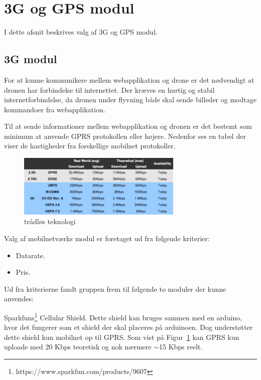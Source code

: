 \section{3G og GPS modul}

I dette afsnit beskrives valg af 3G og GPS modul. 

\subsection{3G modul}
For at kunne kommunikere mellem webapplikation og drone er det nødvendigt at dronen har forbindelse til internettet. 
Der kræves en hurtig og stabil internetforbindelse, da dronen under flyvning både skal sende billeder og modtage kommandoer fra webapplikation.

Til at sende informationer mellem webapplikation og dronen er det bestemt som minimum at anvende GPRS protokollen eller højere. Nedenfor ses en tabel der viser de hastigheder fra forskellige mobilnet protokoller. 

\begin{figure}[H]
\centering
\includegraphics[width=0.7\textwidth]{Billeder/3g-table.png}
\caption[trådløs_teknologi]{trådløs teknologi\protect\footnotemark}
\label{fig:3gtable}
\end{figure}


Valg af mobilnetværks modul er foretaget ud fra følgende kriterier:
\begin{itemize}
	\item Datarate.
	\item Pris.
\end{itemize}

Ud fra kriterierne fandt gruppen frem til følgende to moduler der kunne anvendes:

Sparkfuns\footnote{https://www.sparkfun.com/products/9607} Cellular Shield. Dette shield kan bruges sammen med en arduino, hvor det fungerer som et shield der skal placeres på arduinoen. Dog understøtter dette shield kun mobilnet op til GPRS. Som vist på Figur~\ref{fig:3gtable} kan GPRS kun uploade med 20 Kbps teoretisk og nok nærmere $\sim$15 Kbps reelt.

